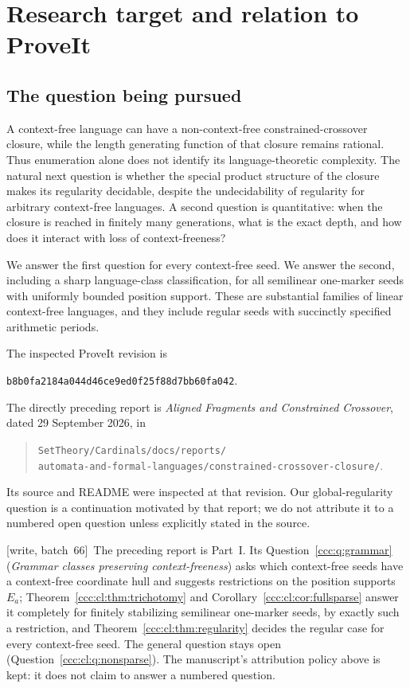 \documentclass[11pt,letterpaper]{article}
\theoremstyle{definition}
\theoremstyle{remark}
\newcommand{\wsix}{\textup{[write, batch~66]}}
\begin{document}
\section{Research target and relation to ProveIt}\label{ccc:cl:sec:scope}

\subsection{The question being pursued}

A context-free language can have a non-context-free constrained-crossover
closure, while the length generating function of that closure remains
rational. Thus enumeration alone does not identify its language-theoretic
complexity. The natural next question is whether the special product
structure of the closure makes its regularity decidable, despite the
undecidability of regularity for arbitrary context-free languages.
A second question is quantitative: when the closure is reached in finitely
many generations, what is the exact depth, and how does it interact with
loss of context-freeness?

We answer the first question for every context-free seed. We answer the
second, including a sharp language-class classification, for all semilinear
one-marker seeds with uniformly bounded position support. These are
substantial families of linear context-free languages, and they include
regular seeds with succinctly specified arithmetic periods.

The inspected ProveIt revision is
\begin{center}\small
\nolinkurl{b8b0fa2184a044d46ce9ed0f25f88d7bb60fa042}.
\end{center}
The directly preceding report is \emph{Aligned Fragments and Constrained
Crossover}, dated 29 September 2026, in
\begin{quote}\small
\nolinkurl{SetTheory/Cardinals/docs/reports/}\\
\nolinkurl{automata-and-formal-languages/constrained-crossover-closure/}.
\end{quote}
Its source and README were inspected at that revision.
Our global-regularity question is a continuation motivated by that report;
we do not attribute it to a numbered open question unless explicitly stated
in the source.

\wsix\ The preceding report is Part~I. Its Question~\ref{ccc:q:grammar}
(\emph{Grammar classes preserving context-freeness}) asks which context-free
seeds have a context-free coordinate hull and suggests restrictions on the
position supports $E_a$; Theorem~\ref{ccc:cl:thm:trichotomy} and
Corollary~\ref{ccc:cl:cor:fullsparse} answer it completely for finitely
stabilizing semilinear one-marker seeds, by exactly such a restriction, and
Theorem~\ref{ccc:cl:thm:regularity} decides the regular case for every
context-free seed. The general question stays open
(Question~\ref{ccc:cl:q:nonsparse}). The manuscript's attribution policy above
is kept: it does not claim to answer a numbered question.
\end{document}
